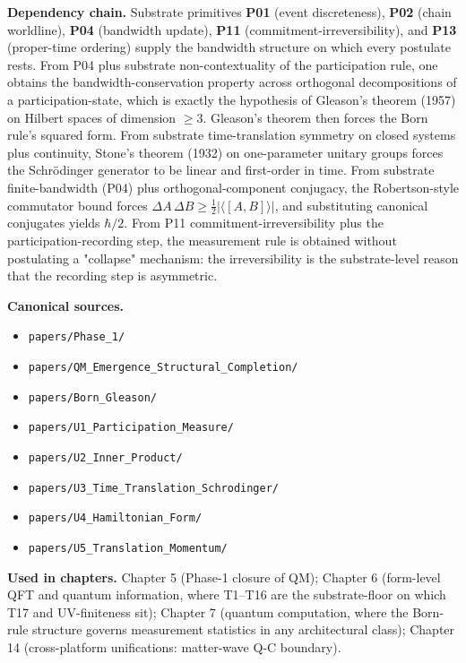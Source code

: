 \documentclass[11pt]{book}
\begin{document}
\textbf{Dependency chain.} Substrate primitives \textbf{P01} (event discreteness), \textbf{P02} (chain worldline), \textbf{P04} (bandwidth update), \textbf{P11} (commitment-irreversibility), and \textbf{P13} (proper-time ordering) supply the bandwidth structure on which every postulate rests. From P04 plus substrate non-contextuality of the participation rule, one obtains the bandwidth-conservation property across orthogonal decompositions of a participation-state, which is exactly the hypothesis of Gleason's theorem (1957) on Hilbert spaces of dimension $\geq 3$. Gleason's theorem then forces the Born rule's squared form. From substrate time-translation symmetry on closed systems plus continuity, Stone's theorem (1932) on one-parameter unitary groups forces the Schrödinger generator to be linear and first-order in time. From substrate finite-bandwidth (P04) plus orthogonal-component conjugacy, the Robertson-style commutator bound forces $\Delta A\,\Delta B \geq \tfrac{1}{2}|\langle[A,B]\rangle|$, and substituting canonical conjugates yields $\hbar/2$. From P11 commitment-irreversibility plus the participation-recording step, the measurement rule is obtained without postulating a "collapse" mechanism: the irreversibility is the substrate-level reason that the recording step is asymmetric.

\textbf{Canonical sources.}
\begin{itemize}
\item \texttt{papers/Phase\_1/}
\item \texttt{papers/QM\_Emergence\_Structural\_Completion/}
\item \texttt{papers/Born\_Gleason/}
\item \texttt{papers/U1\_Participation\_Measure/}
\item \texttt{papers/U2\_Inner\_Product/}
\item \texttt{papers/U3\_Time\_Translation\_Schrodinger/}
\item \texttt{papers/U4\_Hamiltonian\_Form/}
\item \texttt{papers/U5\_Translation\_Momentum/}
\end{itemize}

\textbf{Used in chapters.} Chapter 5 (Phase-1 closure of QM); Chapter 6 (form-level QFT and quantum information, where T1–T16 are the substrate-floor on which T17 and UV-finiteness sit); Chapter 7 (quantum computation, where the Born-rule structure governs measurement statistics in any architectural class); Chapter 14 (cross-platform unifications: matter-wave Q-C boundary).
\end{document}
